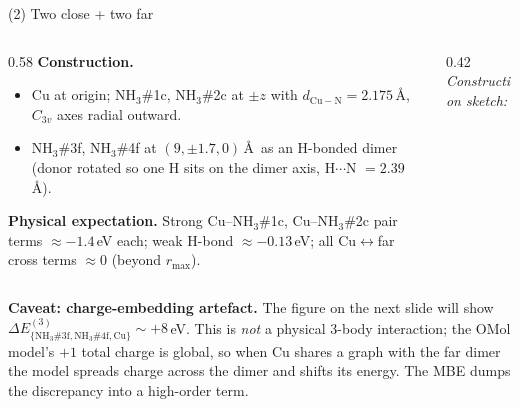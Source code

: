 \documentclass[aspectratio=169,11pt]{beamer}
\begin{document}
\begin{frame}{(2) Two close + two far}
\small
\begin{columns}[T]
\begin{column}{0.58\textwidth}
\textbf{Construction.}
\begin{itemize}\setlength\itemsep{1pt}
\item Cu at origin; NH$_3$\#1c, NH$_3$\#2c at $\pm z$ with
$d_{\mathrm{Cu-N}}=2.175\,$\AA, $C_{3v}$ axes radial outward.
\item NH$_3$\#3f, NH$_3$\#4f at $(9,\pm1.7,0)\,$\AA\ as an H-bonded
dimer (donor rotated so one H sits on the dimer axis, H$\cdots$N
$=2.39\,$\AA).
\end{itemize}

\medskip
\textbf{Physical expectation.} Strong Cu--NH$_3$\#1c, Cu--NH$_3$\#2c
pair terms $\approx -1.4\,$eV each; weak H-bond
$\approx -0.13\,$eV; all Cu$\leftrightarrow$far cross terms $\approx 0$
(beyond $r_{\max}$).
\end{column}
\begin{column}{0.42\textwidth}
\vspace*{4mm}
\centering
\textit{Construction sketch:}\\[2pt]
\end{column}
\end{columns}

\medskip
\textbf{Caveat: charge-embedding artefact.}\;
The figure on the next slide will show
$\Delta E^{(3)}_{\{\mathrm{NH_3\#3f},\mathrm{NH_3\#4f},\mathrm{Cu}\}}\sim+8\,$eV.
This is \emph{not} a physical 3-body interaction; the OMol model's
$+1$ total charge is global, so when Cu shares a graph with the far
dimer the model spreads charge across the dimer and shifts its energy.
The MBE dumps the discrepancy into a high-order term.
\end{frame}
\end{document}
